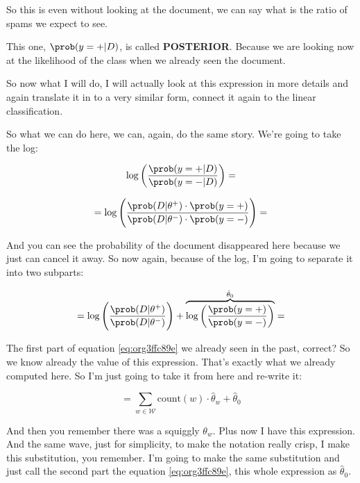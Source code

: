 \documentclass[a4paper, 12pt]{article}
\begin{document}
So this is even without looking at the document, we can say what is the ratio of
spams we expect to see.

This one, \(\prob(y=+|D)\), is called \textbf{POSTERIOR}. Because we are looking now at
the likelihood of the class when we already seen the document.

So now what I will do, I will actually look at this expression in more details
and again translate it in to a very similar form, connect it again to the linear
classification.

So what we can do here, we can, again, do the same story. We're going to take
the log:

\begin{equation}
\label{eq:org2f0b772}
\log \left( \frac{\prob(y=+|D)}{\prob(y=-|D)} \right) = 
\end{equation}

\begin{equation}
\label{eq:org0b751ba}
= \log \left(\frac{\prob(D|\theta^+) \cdot \prob(y=+)}{\prob(D|\theta^-) \cdot \prob(y=-)} \right) =  
\end{equation}

And you can see the probability of the document disappeared here because we just
can cancel it away. So now again, because of the log, I'm going to separate it
into two subparts:

\begin{equation}
\label{eq:org3ffc89e}
= \log \left( \frac{\prob(D|\theta^+)}{\prob(D|\theta^-)} \right) + \overbrace{ \log \left( \frac{\prob(y=+)}{\prob(y=-)} \right)}^{\hat{\theta}_0} =
\end{equation}

The first part of equation \ref{eq:org3ffc89e} we already seen in the past, correct? So we
know already the value of this expression. That's exactly what we already
computed here. So I'm just going to take it from here and re-write it:

\begin{equation}
\label{eq:orga17e6ef}
= \sum_{w \in \mathcal{W}} \text{count}(w) \cdot \hat{\theta}_w + \hat{\theta}_0
\end{equation}

And then you remember there was a squiggly \(\theta_w\). Plus now I have this
expression. And the same wave, just for simplicity, to make the notation really
crisp, I make this substitution, you remember. I'm going to make the same
substitution and just call the second part the equation \ref{eq:org3ffc89e}, this whole
expression as \(\hat{\theta}_0\).
\end{document}
